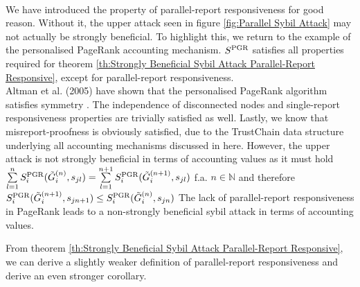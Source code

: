 \begin{remark}[]\ \\
\label{rem:PGR parallel-report responsive}
\noindent{}We have introduced the property of parallel-report responsiveness for good reason. Without it, the upper attack seen in figure \ref{fig:Parallel Sybil Attack} may not actually be strongly beneficial. To highlight this, we return to the example of the personalised PageRank accounting mechanism. $S^{\rm PGR}$ satisfies all properties required for theorem \ref{th:Strongly Beneficial Sybil Attack Parallel-Report Responsive}, except for parallel-report responsiveness.\vspace{1em}\\

\noindent{}Altman et al. (2005) have shown that the personalised PageRank algorithm satisfies symmetry \cite{Ranking Systems: The PageRank Axioms}. The independence of disconnected nodes and single-report responsiveness properties are trivially satisfied as well. Lastly, we know that misreport-proofness is obviously satisfied, due to the TrustChain data structure underlying all accounting mechanisms discussed in here. However, the upper attack is not strongly beneficial in terms of accounting values as it must hold $\sum\limits_{l=1}^{n}S^{\rm PGR}_i(\tilde{G}_i^{(n)},s_{jl}) = \sum\limits_{l=1}^{n+1}S^{\rm PGR}_i(\tilde{G}_i^{(n+1)},s_{jl})$ f.a. $n\in\mathbb{N}$ and therefore $S^{\rm PGR}_i(\tilde{G}_i^{(n+1)},s_{jn+1})\leq{}S^{\rm PGR}_i(\tilde{G}_i^{(n)},s_{jn})$ The lack of parallel-report responsiveness in PageRank leads to a non-strongly beneficial sybil attack in terms of accounting values. \vspace{1em}\\
\end{remark}

\noindent{}From theorem \ref{th:Strongly Beneficial Sybil Attack Parallel-Report Responsive}, we can derive a slightly weaker definition of parallel-report responsiveness and derive an even stronger corollary. 

